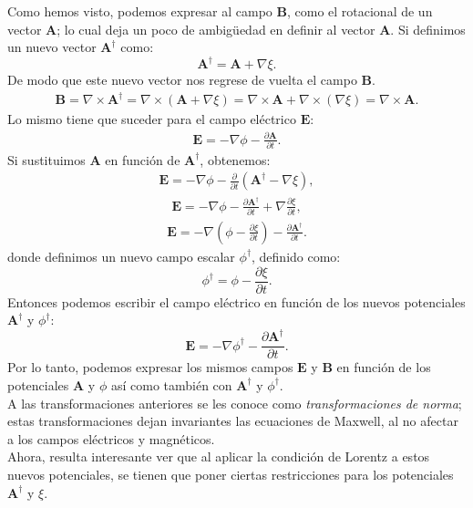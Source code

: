 \documentclass[11pt,fleqn]{book} %
\begin{document}
Como hemos visto, podemos expresar al campo $\textbf{B}$, como el rotacional de un vector $\textbf{A}$; lo cual deja un poco de ambigüedad en definir al vector $\textbf{A}$. Si definimos un nuevo vector $\textbf{A}^{\dagger}$ como:
\begin{equation}
 \textbf{A}^{\dagger}=\textbf{A}+\nabla\xi. \label{A daga}
 \end{equation}
 De modo que este nuevo vector nos regrese de vuelta el campo $\textbf{B}$.
\begin{eqnarray*}
\textbf{B}=\nabla\times\textbf{A}^{\dagger}=\nabla\times(\textbf{A}+\nabla\xi)=\nabla\times\textbf{A}+\nabla\times(\nabla\xi)=\nabla\times\textbf{A}.
\end{eqnarray*}
Lo mismo tiene que suceder para el campo el\'ectrico $\textbf{E}$:
\begin{eqnarray*}
\textbf{E}=-\nabla\phi-\frac{\partial \textbf{A}}{\partial t}.
\end{eqnarray*}
Si sustituimos $\textbf{A}$ en funci\'on de $\textbf{A}^{\dagger}$, obtenemos:
\begin{eqnarray*}
\textbf{E}=-\nabla\phi-\frac{\partial}{\partial t}\left(\textbf{A}^{\dagger}-\nabla\xi\right),
\end{eqnarray*}
\begin{eqnarray*}
\textbf{E}=-\nabla\phi-\frac{\partial \textbf{A}^{\dagger}}{\partial t}+\nabla\frac{\partial \xi}{\partial t},
\end{eqnarray*}
\begin{eqnarray*}
\textbf{E}=-\nabla\left(\phi-\frac{\partial \xi}{\partial t}\right)-\frac{\partial \textbf{A}^{\dagger}}{\partial t}.
\end{eqnarray*}
donde definimos un nuevo campo escalar $\phi^{\dagger}$, definido como:
\begin{equation}
\phi^{\dagger}=\phi-\frac{\partial \xi}{\partial t}.  \label{Phi daga}
\end{equation}
Entonces podemos escribir el campo el\'ectrico en funci\'on de los nuevos potenciales $\textbf{A}^{\dagger}$ y $\phi^{\dagger}$:
\begin{equation}
\textbf{E}=-\nabla\phi^{\dagger}-\frac{\partial \textbf{A}^{\dagger}}{\partial t}.
\end{equation}
Por lo tanto, podemos expresar los mismos campos $\textbf{E}$ y $\textbf{B}$ en funci\'on de los potenciales $\textbf{A}$ y $\phi$ as\'i como tambi\'en con $\textbf{A}^{\dagger}$ y $\phi^{\dagger}$.\\
A las transformaciones anteriores se les conoce como \textit{transformaciones de norma}; estas transformaciones dejan invariantes las ecuaciones de Maxwell, al no afectar a los campos el\'ectricos y magn\'eticos.\\
Ahora, resulta interesante ver que al aplicar la condici\'on de Lorentz a estos nuevos potenciales, se tienen que poner ciertas restricciones para los potenciales $\textbf{A}^{\dagger}$ y $\xi$.
\end{document}
